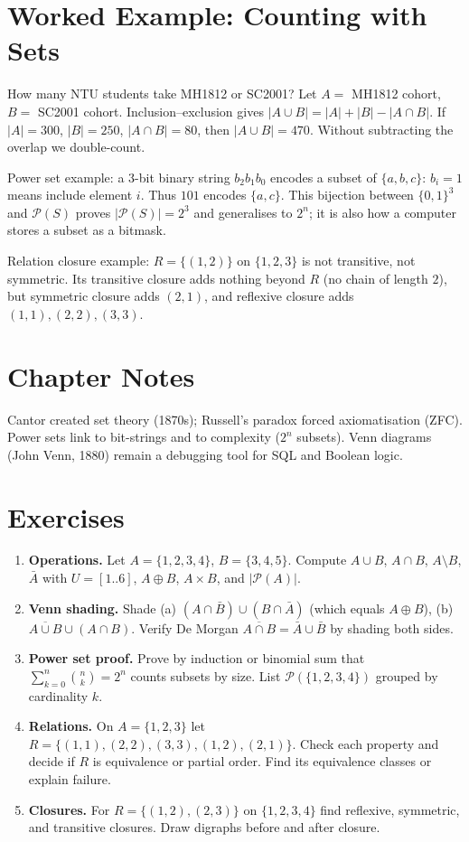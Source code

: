 \section{Worked Example: Counting with Sets}
How many NTU students take MH1812 or SC2001? Let $A=$ MH1812 cohort, $B=$ SC2001 cohort. Inclusion--exclusion gives $|A\cup B|=|A|+|B|-|A\cap B|$. If $|A|=300$, $|B|=250$, $|A\cap B|=80$, then $|A\cup B|=470$. Without subtracting the overlap we double-count.

Power set example: a $3$-bit binary string $b_2b_1b_0$ encodes a subset of $\{a,b,c\}$: $b_i=1$ means include element $i$. Thus $101$ encodes $\{a,c\}$. This bijection between $\{0,1\}^3$ and $\mathcal{P}(S)$ proves $|\mathcal{P}(S)|=2^3$ and generalises to $2^n$; it is also how a computer stores a subset as a bitmask.

Relation closure example: $R=\{(1,2)\}$ on $\{1,2,3\}$ is not transitive, not symmetric. Its transitive closure adds nothing beyond $R$ (no chain of length $2$), but symmetric closure adds $(2,1)$, and reflexive closure adds $(1,1),(2,2),(3,3)$.

\section{Chapter Notes}
Cantor created set theory (1870s); Russell's paradox forced axiomatisation (ZFC). Power sets link to bit-strings and to complexity ($2^n$ subsets). Venn diagrams (John Venn, 1880) remain a debugging tool for SQL and Boolean logic.

\section{Exercises}
\label{sec:ch02-exercises}
\begin{enumerate}[label=E2.\arabic*, leftmargin=*, itemsep=0.6em]
\item \textbf{Operations.} Let $A=\{1,2,3,4\}$, $B=\{3,4,5\}$. Compute $A\cup B$, $A\cap B$, $A\setminus B$, $\bar A$ with $U=[1..6]$, $A\oplus B$, $A\times B$, and $|\mathcal{P}(A)|$.
\item \textbf{Venn shading.} Shade (a) $(A\cap\bar B)\cup(B\cap\bar A)$ (which equals $A\oplus B$), (b) $\overline{A\cup B}\cup(A\cap B)$. Verify De Morgan $\overline{A\cap B}=\bar A\cup\bar B$ by shading both sides.
\item \textbf{Power set proof.} Prove by induction or binomial sum that $\sum_{k=0}^{n}\binom{n}{k}=2^n$ counts subsets by size. List $\mathcal{P}(\{1,2,3,4\})$ grouped by cardinality $k$.
\item \textbf{Relations.} On $A=\{1,2,3\}$ let $R=\{(1,1),(2,2),(3,3),(1,2),(2,1)\}$. Check each property and decide if $R$ is equivalence or partial order. Find its equivalence classes or explain failure.
\item \textbf{Closures.} For $R=\{(1,2),(2,3)\}$ on $\{1,2,3,4\}$ find reflexive, symmetric, and transitive closures. Draw digraphs before and after closure.
\end{enumerate}
